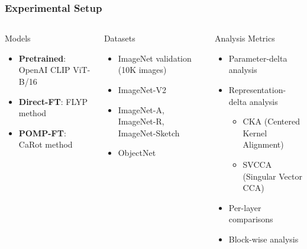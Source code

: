 \documentclass[aspectratio=1610, fontsize=8pt]{beamer}
\begin{document}
\begin{frame}
    \frametitle{Experimental Setup}
    \begin{columns}
        \begin{block}{Models}
            \begin{itemize}
                \item \textbf{Pretrained}: OpenAI CLIP ViT-B/16
                \item \textbf{Direct-FT}: FLYP method
                \item \textbf{POMP-FT}: CaRot method
            \end{itemize}
        \end{block}
        
        \begin{block}{Datasets}
            \begin{itemize}
                \item ImageNet validation (10K images)
                \item ImageNet-V2
                \item ImageNet-A, ImageNet-R, ImageNet-Sketch
                \item ObjectNet
            \end{itemize}
        \end{block}
        
        \begin{block}{Analysis Metrics}
            \begin{itemize}
                \item Parameter-delta analysis
                \item Representation-delta analysis
                \begin{itemize}
                    \item CKA (Centered Kernel Alignment)
                    \item SVCCA (Singular Vector CCA)
                \end{itemize}
                \item Per-layer comparisons
                \item Block-wise analysis
            \end{itemize}
        \end{block}
    \end{columns}
\end{frame}

\end{document}
